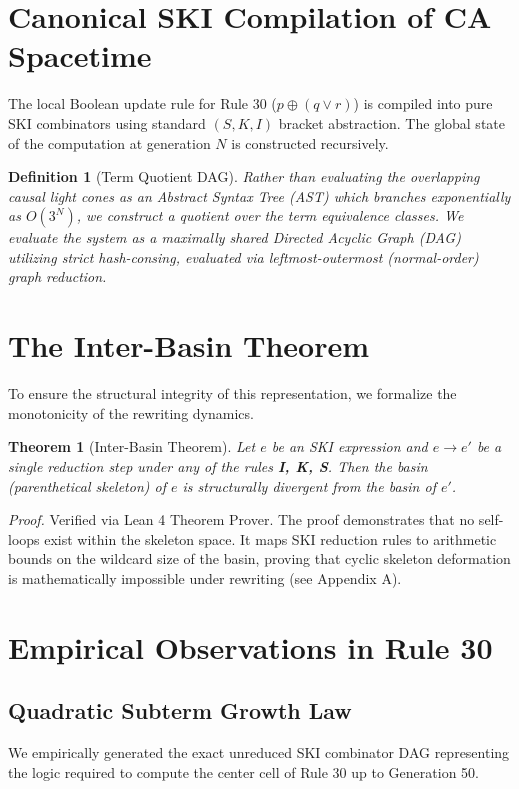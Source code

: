 \documentclass[11pt]{article}
\newtheorem{theorem}{Theorem}
\newtheorem{definition}{Definition}
\begin{document}
\section{Canonical SKI Compilation of CA Spacetime}
The local Boolean update rule for Rule 30 ($p \oplus (q \lor r)$) is compiled into pure SKI combinators using standard $(S, K, I)$ bracket abstraction. The global state of the computation at generation $N$ is constructed recursively. 

\begin{definition}[Term Quotient DAG]
Rather than evaluating the overlapping causal light cones as an Abstract Syntax Tree (AST) which branches exponentially as $O(3^N)$, we construct a quotient over the term equivalence classes. We evaluate the system as a maximally shared Directed Acyclic Graph (DAG) utilizing strict hash-consing, evaluated via leftmost-outermost (normal-order) graph reduction. 
\end{definition}

\section{The Inter-Basin Theorem}
To ensure the structural integrity of this representation, we formalize the monotonicity of the rewriting dynamics.

\begin{theorem}[Inter-Basin Theorem]
Let $e$ be an SKI expression and $e \to e'$ be a single reduction step under any of the rules \textbf{I, K, S}. Then the basin (parenthetical skeleton) of $e$ is structurally divergent from the basin of $e'$.
\end{theorem}

\textit{Proof.} Verified via Lean 4 Theorem Prover. The proof demonstrates that no self-loops exist within the skeleton space. It maps SKI reduction rules to arithmetic bounds on the wildcard size of the basin, proving that cyclic skeleton deformation is mathematically impossible under rewriting (see Appendix A).

\section{Empirical Observations in Rule 30}

\subsection{Quadratic Subterm Growth Law}
We empirically generated the exact unreduced SKI combinator DAG representing the logic required to compute the center cell of Rule 30 up to Generation 50.
\end{document}

